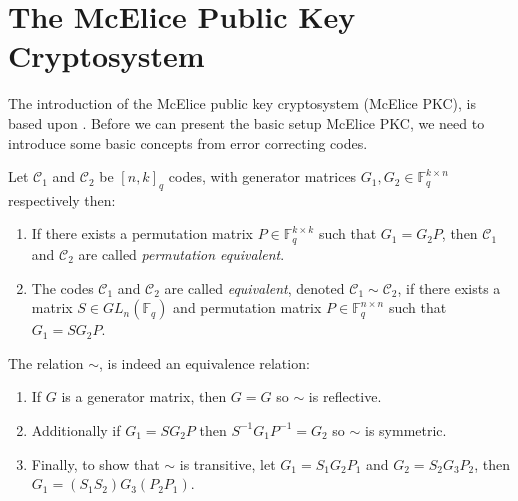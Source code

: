 \section{The McElice Public Key Cryptosystem}
The introduction of the McElice public key cryptosystem (McElice PKC), is based upon \cite{r6}. Before we can present the basic setup McElice PKC, we need to introduce some basic concepts from error correcting codes.

\begin{definition}
  Let $\mathcal{C}_1$ and $\mathcal{C}_2$ be $[n, k]_{q}$ codes, with generator matrices $G_1, G_2 \in \mathbb{F}_q^{k \times n}$ respectively then:
  \begin{enumerate}
    \item If there exists a permutation matrix $P \in  \mathbb{F}_{q}^{k \times k}$ such that $G_1 = G_{2}P$, then $\mathcal{C}_1$ and $\mathcal{C}_{2}$ are called \textit{permutation equivalent}.
    \item The codes $\mathcal{C}_1$ and $\mathcal{C}_2$ are called \textit{equivalent}, denoted $\mathcal{C}_1 \sim \mathcal{C}_{2}$, if there exists a matrix $S \in GL_n(\mathbb{F}_q)$ and permutation matrix $P \in \mathbb{F}_q^{n \times n}$ such that $G_1 = S G_2P$.
  \end{enumerate}
\end{definition}
\begin{remark}
  The relation $\sim$, is indeed an equivalence relation:
  \begin{enumerate}
\item If $G$ is a generator matrix, then $G = G$ so $\sim$ is reflective.
\item Additionally if $G_1 = SG_2P$  then $S^{-1}G_1P^{-1} = G_2$ so $\sim$ is symmetric.
\item Finally, to show that $\sim$ is transitive, let $G_1 = S_1G_2P_1$ and $G_2 = S_2G_{3}P_2$, then $G_1 = (S_1S_2)G_3(P_2P_1)$.
  \end{enumerate}
\end{remark}


